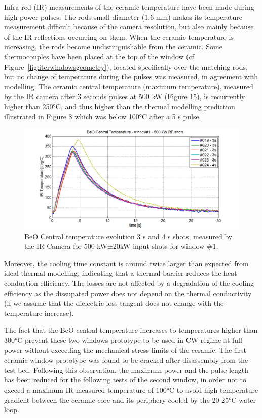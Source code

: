 Infra-red (IR) measurements of the ceramic temperature have been made during high power pulses.  The rods small diameter (1.6 mm) makes its temperature measurement difficult because of the camera resolution, but also mainly because of the IR reflections occurring on them. When the ceramic temperature is increasing, the rods become undistinguishable from the ceramic. Some thermocouples have been placed at the top of the window (cf Figure~\ref{fig:iterwindowsgeometry}), located specifically over the matching rods, but no change of temperature during the pulses was measured, in agreement with modelling. The ceramic central temperature (maximum temperature), measured by the IR camera after 3 seconds pulses at 500 kW (Figure 15), is recurrently higher than 250$\si{\degreeCelsius}$, and thus higher than the thermal modelling prediction illustrated in Figure 8 which was below 100$\si{\degreeCelsius}$ after a 5 s pulse. 

\begin{figure}
	\centering
	\includegraphics[width=1.0\linewidth]{figures/chap3/ITER_window/ITER_windows_BeO_temperature}
	\caption{BeO Central temperature evolution 3 s and 4 s shots, measured by the IR Camera for 500 kW±20kW input shots for window \#1.}
	\label{fig:iterwindowsbeotemperature}
\end{figure}

Moreover, the cooling time constant is around twice larger than expected from ideal thermal modelling, indicating that a thermal barrier reduces the heat conduction efficiency. The losses are not affected by a degradation of the cooling efficiency as the dissupated power does not depend on the thermal conductivity (if we assume that the dielectric loss tangent does not change with the temperature increase). 

The fact that the BeO central temperature increases to temperatures higher than 300$\si{\degreeCelsius}$ prevent these two windows prototype to be used in CW regime at full power without exceeding the mechanical stress limits of the ceramic. The first ceramic window prototype was found to be cracked after disassembly from the test-bed. Following this observation, the maximum power and the pulse length has been reduced for the following tests of the second window, in order not to exceed a maximum IR measured temperature of 100$\si{\degreeCelsius}$ to avoid high temperature gradient between the ceramic core and its periphery cooled by the 20-25$\si{\degreeCelsius}$ water loop. 



